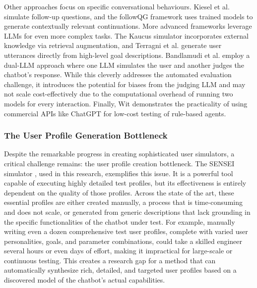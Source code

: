 Other approaches focus on specific conversational behaviours.
Kiesel et al. \autocite{kieselSimulatingFollowUpQuestions2024}
simulate follow-up questions,
and the followQG framework \autocite{bImprovingAsynchronousInterview2021}
uses trained models to generate contextually relevant continuations.
More advanced frameworks leverage \acp{LLM} for even more complex tasks.
The Kaucus simulator \autocite{dholeKAUCUSKnowledgeAugmented2024}
incorporates external knowledge via retrieval augmentation,
and Terragni et al. \autocite{terragniInContextLearningUser2023}
generate user utterances directly from high-level goal descriptions.
Bandlamudi et al. \autocite{bandlamudiFrameworkEnableTest2024}
employ a dual-\ac{LLM} approach where
one \ac{LLM} simulates the user and
another judges the chatbot's response.
While this cleverly addresses the automated evaluation challenge,
it introduces the potential for biases from the judging LLM
and may not scale cost-effectively due to the computational overhead
of running two models for every interaction.
Finally, Wit \autocite{dewitLeveragingLargeLanguage2024}
demonstrates the practicality of using commercial APIs like ChatGPT
for low-cost testing of rule-based agents.

\subsubsection{The User Profile Generation Bottleneck}
Despite the remarkable progress in creating sophisticated user simulators,
a critical challenge remains:
the user profile creation bottleneck.
The SENSEI simulator \autocite{delaraAutomatedEndtoEndTesting2025, delaraSensei},
used in this research, exemplifies this issue.
It is a powerful tool capable of executing highly detailed test profiles,
but its effectiveness is entirely dependent on the quality of those profiles.
Across the state of the art,
these essential profiles are either created manually,
a process that is time-consuming and does not scale,
or generated from generic descriptions
that lack grounding in the specific functionalities of the chatbot under test.
For example, manually writing even a dozen comprehensive test user profiles,
complete with varied user personalities, goals, and parameter combinations,
could take a skilled engineer several hours or even days of effort,
making it impractical for large-scale or continuous testing.
This creates a research gap
for a method that can automatically synthesize
rich, detailed, and targeted user profiles
based on a discovered model of the chatbot's actual capabilities.

